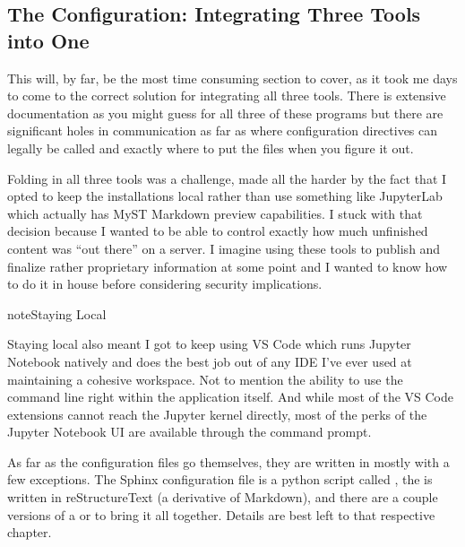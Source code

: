 \documentclass[letterpaper,12pt,english]{sphinxmanual}
\begin{document}
\subsection{The Configuration: Integrating Three Tools into One}
\label{\detokenize{_notebooks/00-the-goal:the-configuration-integrating-three-tools-into-one}}
\sphinxAtStartPar
This will, by far, be the most time consuming section to cover, as it took me days to come to the correct solution for integrating all three tools. There is extensive documentation \textendash{}as you might guess\textendash{} for all three of these programs but there are significant holes in communication as far as where configuration directives can legally be called and exactly where to put the files when you figure it out.

\sphinxAtStartPar
Folding in all three tools was a challenge, made all the harder by the fact that I opted to keep the installations local rather than use something like JupyterLab which actually has MyST Markdown preview capabilities. I stuck with that decision because I wanted to be able to control exactly how much unfinished content was “out there” on a server. I imagine using these tools to publish and finalize rather proprietary information at some point and I wanted to know how to do it in house before considering security implications.

\begin{sphinxadmonition}{note}{Staying Local}

\sphinxAtStartPar
Staying local also meant I got to keep using VS Code which runs Jupyter Notebook natively and does the best job out of any IDE I’ve ever used at maintaining a cohesive workspace. Not to mention the ability to use the command line right within the application itself. And while most of the VS Code extensions cannot reach the Jupyter kernel directly, most of the perks of the Jupyter Notebook UI are available through the command prompt.
\end{sphinxadmonition}

\sphinxAtStartPar
As far as the configuration files go themselves, they are written in  mostly with a few exceptions. The Sphinx configuration file is a python script called , the {\hyperref[\detokenize{index::doc}]{}} is written in reStructureText (a derivative of Markdown), and there are a couple versions of a  \textendash{}or\textendash{} to bring it all together. Details are best left to that respective chapter.
\end{document}
